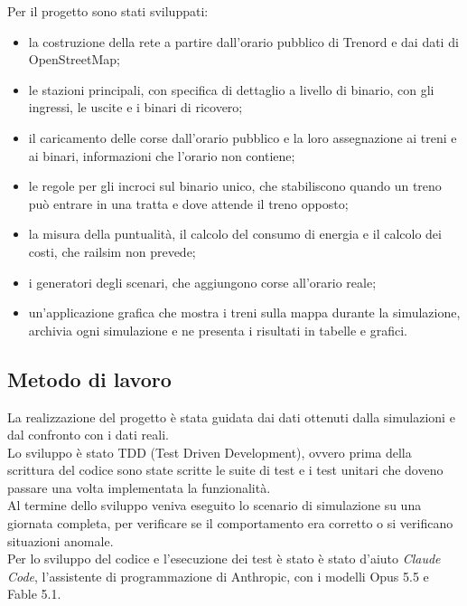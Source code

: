 Per il progetto sono stati sviluppati:
\begin{itemize}
	\item la costruzione della rete a partire dall'orario pubblico di Trenord e dai dati di OpenStreetMap;
	\item le stazioni principali, con specifica di dettaglio a livello di binario, con gli ingressi, le uscite e i binari di ricovero;
	\item il caricamento delle corse dall'orario pubblico e la loro assegnazione ai treni e ai binari, informazioni che l'orario non contiene;
	\item le regole per gli incroci sul binario unico, che stabiliscono quando un treno può entrare in una tratta e dove attende il treno opposto;
	\item la misura della puntualità, il calcolo del consumo di energia e il calcolo dei costi, che railsim non prevede;
	\item i generatori degli scenari, che aggiungono corse all'orario reale;
	\item un'applicazione grafica che mostra i treni sulla mappa durante la simulazione, archivia ogni simulazione e ne presenta i risultati in tabelle e grafici.
\end{itemize}

\subsection{Metodo di lavoro}
La realizzazione del progetto è stata guidata dai dati ottenuti dalla simulazioni e dal confronto con i dati reali.\\
Lo sviluppo è stato TDD (Test Driven Development), ovvero prima della scrittura del codice sono state scritte le suite di test e i test unitari che doveno passare una volta implementata la funzionalità.\\
Al termine dello sviluppo veniva eseguito lo scenario di simulazione su una giornata completa, per verificare se il comportamento era corretto o si verificano situazioni anomale.\\
Per lo sviluppo del codice e l'esecuzione dei test è stato è stato d'aiuto \textit{Claude Code}, l'assistente di programmazione di Anthropic, con i modelli Opus 5.5 e Fable 5.1.